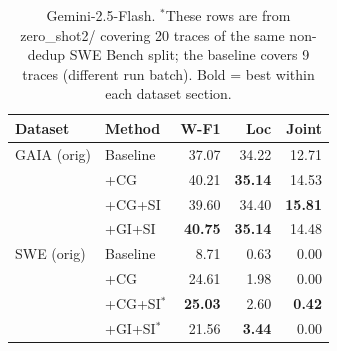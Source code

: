 %
%
%
%


\begin{table}[h]
\centering\small
\begin{tabular}{ll rrr}
\toprule
\textbf{Dataset} & \textbf{Method} & \textbf{W-F1} & \textbf{Loc} & \textbf{Joint} \\
\midrule
GAIA (orig) & Baseline  & 37.07 & 34.22 & 12.71 \\
            & +CG       & 40.21 & \textbf{35.14} & 14.53 \\
            & +CG+SI    & 39.60 & 34.40 & \textbf{15.81} \\
            & +GI+SI    & \textbf{40.75} & \textbf{35.14} & 14.48 \\
\midrule
SWE (orig)  & Baseline  &  8.71 &  0.63 &  0.00 \\
            & +CG       & 24.61 &  1.98 &  0.00 \\
            & +CG+SI$^*$ & \textbf{25.03} &  2.60 & \textbf{0.42} \\
            & +GI+SI$^*$ & 21.56 & \textbf{3.44} &  0.00 \\
\bottomrule
\end{tabular}
\caption{Gemini-2.5-Flash. $^*$These rows are from zero\_shot2/ covering 20 traces
  of the same non-dedup SWE Bench split; the baseline covers 9 traces (different run batch).
  Bold = best within each dataset section.}
\end{table}


